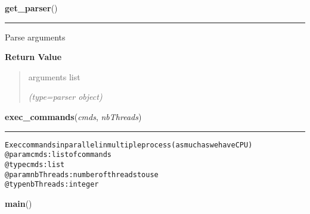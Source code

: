 \hspace{.8\funcindent}\begin{boxedminipage}{\funcwidth}

    \raggedright \textbf{get\_parser}()

    \vspace{-1.5ex}

    \rule{\textwidth}{0.5\fboxrule}
\setlength{\parskip}{2ex}
    Parse arguments

\setlength{\parskip}{1ex}
      \textbf{Return Value}
    \vspace{-1ex}

      \begin{quote}
      arguments list

      {\it (type=parser object)}

      \end{quote}

    \end{boxedminipage}

    \label{script-iVCFmerge_SNP:exec_commands}

    \vspace{0.5ex}

\hspace{.8\funcindent}\begin{boxedminipage}{\funcwidth}

    \raggedright \textbf{exec\_commands}(\textit{cmds}, \textit{nbThreads})

    \vspace{-1.5ex}

    \rule{\textwidth}{0.5\fboxrule}
\setlength{\parskip}{2ex}
\begin{alltt}

Exec commands in parallel in multiple process (as much as we have CPU)
@param cmds: list of commands
    @type cmds: list
    @param nbThreads: number of threads to use
    @type nbThreads: integer
\end{alltt}

\setlength{\parskip}{1ex}
    \end{boxedminipage}

    \label{script-iVCFmerge_SNP:main}

    \vspace{0.5ex}

\hspace{.8\funcindent}\begin{boxedminipage}{\funcwidth}

    \raggedright \textbf{main}()

\setlength{\parskip}{2ex}
\setlength{\parskip}{1ex}
    \end{boxedminipage}


